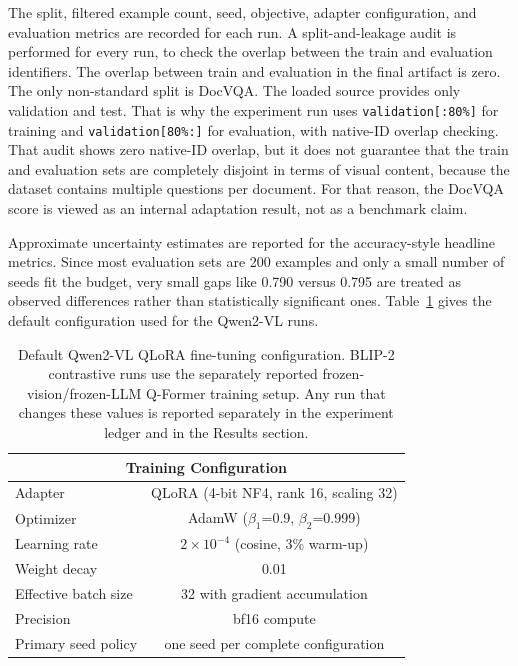 \documentclass[preprint,12pt]{elsarticle}
\begin{document}
The split, filtered example count, seed, objective, adapter configuration, and evaluation metrics are recorded for each run.
A split-and-leakage audit is performed for every run, to check the overlap between the train and evaluation identifiers.
The overlap between train and evaluation in the final artifact is zero.
The only non-standard split is DocVQA.
The loaded source provides only validation and test.
That is why the experiment run uses \texttt{validation[:80\%]} for training and \texttt{validation[80\%:]} for evaluation, with native-ID overlap checking.
That audit shows zero native-ID overlap, but it does not guarantee that the train and evaluation sets are completely disjoint in terms of visual content, because the dataset contains multiple questions per document.
For that reason, the DocVQA score is viewed as an internal adaptation result, not as a benchmark claim.

Approximate uncertainty estimates are reported for the accuracy-style headline metrics.
Since most evaluation sets are 200 examples and only a small number of seeds fit the budget,
very small gaps like 0.790 versus 0.795 are treated as observed differences rather than statistically significant ones.
Table~\ref{tab:Config} gives the default configuration used for the Qwen2-VL runs.

\begin{table}[!ht]
\centering
\caption{Default Qwen2-VL QLoRA fine-tuning configuration. BLIP-2 contrastive runs use the separately reported frozen-vision/frozen-LLM Q-Former training setup. Any run that changes these values is reported separately in the experiment ledger and in the Results section.}
\label{tab:Config}
\begin{tabular}{|l|c|}
\hline
\multicolumn{2}{|c|}{\textbf{Training Configuration}} \\ \hline
Adapter & QLoRA (4-bit NF4, rank 16, scaling 32) \\
Optimizer & AdamW ($\beta_1$=0.9, $\beta_2$=0.999) \\
Learning rate & $2 \times 10^{-4}$ (cosine, 3\% warm-up) \\
Weight decay & 0.01 \\
Effective batch size & 32 with gradient accumulation \\
Precision & bf16 compute \\
Primary seed policy & one seed per complete configuration \\ \hline
\end{tabular}
\end{table}
\end{document}
